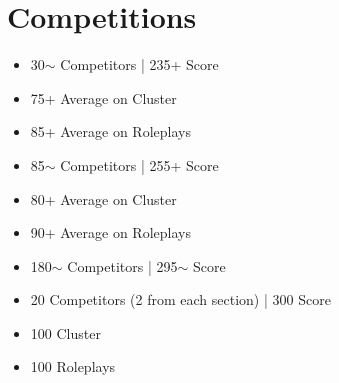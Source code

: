 \chapter{Competitions}

\begin{itemize}
    \item 30$\sim$ Competitors | 235+ Score
    \item 75+ Average on Cluster
    \item 85+ Average on Roleplays
\end{itemize}

\noindent {} 
\begin{itemize}
    \item 85$\sim$ Competitors | 255+ Score
    \item 80+ Average on Cluster
    \item 90+ Average on Roleplays
\end{itemize}


\noindent {} 
\begin{itemize}
    \item 180$\sim$  Competitors | 295$\sim$ Score 
    \item 20 Competitors (2 from each section) | 300 Score 
    \item 100 Cluster
    \item 100 Roleplays
\end{itemize}